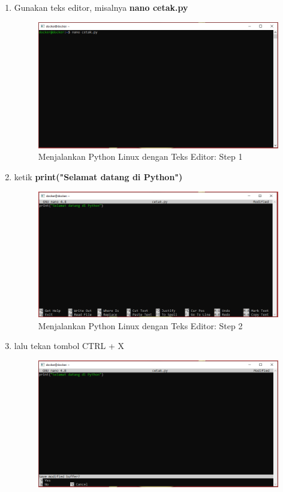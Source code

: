\begin{enumerate}
\item Gunakan teks editor, misalnya \textbf{nano cetak.py}
\begin{figure}[H]
        \centerline{\includegraphics[scale=0.5]{figures/menjalankan-python-linux-with-nano/step1}}
        \caption{Menjalankan Python Linux dengan Teks Editor: Step 1}
\end{figure}
\item ketik \textbf{print("Selamat datang di Python")}
\begin{figure}[H]
        \centerline{\includegraphics[scale=0.5]{figures/menjalankan-python-linux-with-nano/step2}}
        \caption{Menjalankan Python Linux dengan Teks Editor: Step 2}
\end{figure}
\item lalu tekan tombol CTRL + X
\begin{figure}[H]
        \centerline{\includegraphics[scale=0.5]{figures/menjalankan-python-linux-with-nano/step3}}

\end{figure}
\end{enumerate}
